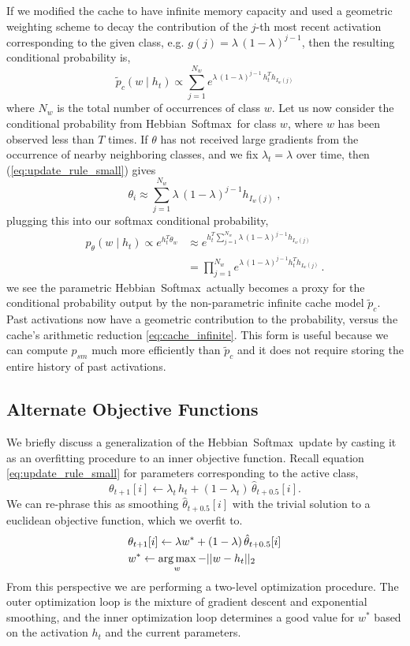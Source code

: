 \documentclass{article} \usepackage{hyperref}
\DeclareMathOperator*{\argmax}{arg\,max}
\newcommand{\model}{\hbox{Hebbian Softmax }}
\def\argmax{\operatornamewithlimits{arg\,max}}
\begin{document}
If we modified the cache to have infinite memory capacity and used a geometric weighting scheme to decay the contribution of the $j$-th most recent activation corresponding to the given class, e.g. $g(j) = \lambda \, (1 - \lambda)^{j-1}$, then the resulting conditional probability is,
\begin{equation}
\label{eq:cache_infinite}
\tilde{p}_c (w \mid h_t) \propto \sum_{j = 1}^{N_w} e^{\lambda \, (1 - \lambda)^{j-1} \, h_t^T h_{I_w(j)}}
\end{equation}
where $N_w$ is the total number of occurrences of class $w$. Let us now consider the conditional probability from \model for class $w$, where $w$ has been observed less than $T$ times. If $\theta$ has not received large gradients from the occurrence of nearby neighboring classes, and we fix $\lambda_t = \lambda$ over time, then (\ref{eq:update_rule_small}) gives
\[\theta_i \approx \sum_{j = 1}^{N_w}  \lambda \, (1 - \lambda)^{j-1} h_{I_w(j)} \; ,\]
plugging this into our softmax conditional probability,
\begin{align*}
p_{\theta}(w \mid h_t) \propto e^{h_t^T \theta_w} & \approx e^{h_t^T \sum_{j=1}^{N_w} \lambda \, (1 - \lambda)^{j-1} h_{I_w(j)}} \\
& = \prod_{j=1}^{N_w} e^{\lambda \, (1 - \lambda)^{j-1} h_t^T h_{I_w(j)}} \, .
\end{align*}
we see the parametric \model actually becomes a proxy for the conditional probability output by the non-parametric infinite cache model $\tilde{p}_c$. Past activations now have a geometric contribution to the probability, versus the cache's arithmetic reduction \eqref{eq:cache_infinite}. This form is useful because we can compute $p_{sm}$ much more efficiently than $\tilde{p}_c$ and it does not require storing the entire history of past activations.

\subsection{Alternate Objective Functions}
\label{sec:alternates}
We briefly discuss a generalization of the \model update by casting it as an overfitting procedure to an inner objective function. Recall equation \eqref{eq:update_rule_small} for parameters corresponding to the active class, 
\begin{equation*}
\theta_{t+1}[i] \leftarrow \lambda_t \, h_t + (1 - \lambda_t) \, \hat\theta_{t+0.5}[i].
\end{equation*}
We can re-phrase this as smoothing $\hat\theta_{t+0.5}[i]$ with the trivial solution to a euclidean objective function, which we overfit to. 
\begin{align*}
& \theta_{t+1}[i] \leftarrow \lambda w^* + (1 - \lambda) \, \hat\theta_{t+0.5}[i]  \\
\vspace{0.5em} & w^* \leftarrow \argmax_w -||w - h_t||_2 
\end{align*}
From this perspective we are performing a two-level optimization procedure. The outer optimization loop is the mixture of gradient descent and exponential smoothing, and the inner optimization loop determines a good value for $w^*$ based on the activation $h_t$ and the current parameters.
\end{document}
